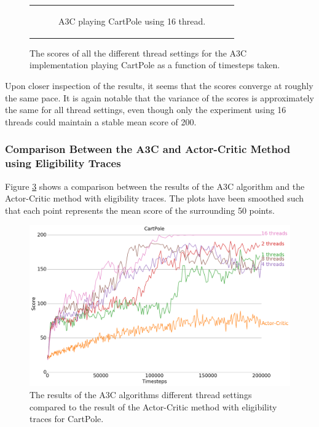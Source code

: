 \documentclass[11pt]{article}
\begin{document}
\begin{figure}[H]
\begin{tabular}[c]{c}
\begin{subfigure}[c]{.5\textwidth}
        \caption{A3C playing CartPole using 16 thread.}
        \label{cp:16}
    \end{subfigure}
  \end{tabular}
  \caption{The scores of all the different thread settings for the
    A3C implementation playing CartPole as a function of timesteps taken.}
     \label{fig:a3c_comp_steps}
\end{figure}

Upon closer inspection of the results, it seems that the scores
converge at roughly the same pace.
It is again notable that the variance of the scores is approximately
the same for all thread settings, even though only the experiment using 16 threads
could maintain a stable mean score of 200.

\subsubsection{Comparison Between the A3C and Actor-Critic Method using Eligibility Traces}

Figure \ref{fig:a3c_comp_eligibility} shows a comparison between the
results of the A3C algorithm and the Actor-Critic method with eligibility
traces.
The plots have been smoothed such that each point represents the mean score of the surrounding 50
points.

\begin{figure}[H]
    \centering
    \includegraphics[scale=0.4]{plots/cartpole_compare_counter_with_AC.png}
    \caption{The results of the A3C algorithms different thread
            settings compared to the result of the Actor-Critic method
            with eligibility traces for CartPole.}
    \label{fig:a3c_comp_eligibility}
\end{figure}
\end{document}
